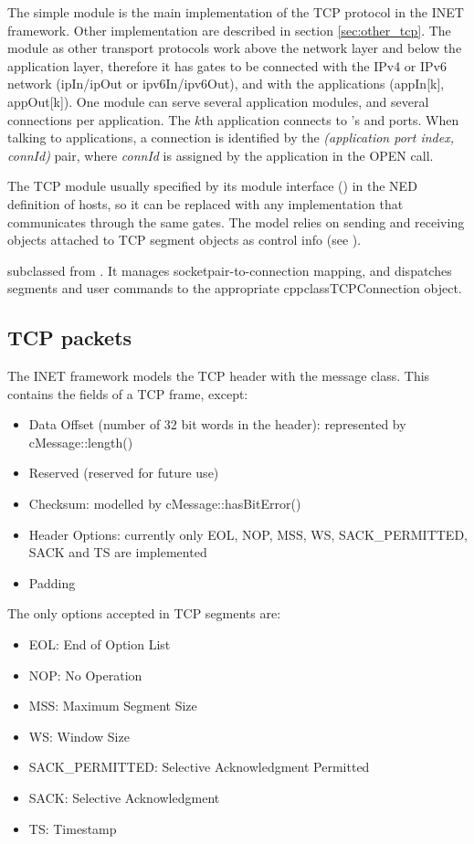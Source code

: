 The  simple module is the main implementation of the TCP protocol in the INET framework.
Other implementation are described in section \ref{sec:other_tcp}.
The  module as other transport protocols work above the network layer and below the application
layer, therefore it has gates to be connected with the IPv4 or IPv6 network (ipIn/ipOut or ipv6In/ipv6Out),
and with the applications (appIn[k], appOut[k]).
One  module can serve several application modules, and several
connections per application. The $k$th application connects to 's
 and  ports. When talking to applications, a
connection is identified by the \textit{(application port index, connId)} pair,
where \textit{connId} is assigned by the application in the OPEN call.

The TCP module usually specified by its module interface
() in the NED definition of hosts, so it can be replaced with any implementation
that communicates through the same gates. The  model relies on
sending and receiving  objects
attached to TCP segment objects as control info (see ).

 subclassed from . It manages socketpair-to-connection
mapping, and dispatches segments and user commands to the appropriate cppclass{TCPConnection} object.

\subsection{TCP packets}

The INET framework models the TCP header with the  message class.
This contains the fields of a TCP frame, except:
\begin{itemize}
  \item Data Offset (number of 32 bit words in the header): represented by cMessage::length()
  \item Reserved (reserved for future use)
  \item Checksum: modelled by cMessage::hasBitError()
  \item Header Options: currently only EOL, NOP, MSS, WS, SACK\_PERMITTED, SACK and TS are implemented
  \item Padding
\end{itemize}

The only options accepted in TCP segments are:
\begin{itemize}
  \item EOL: End of Option List
  \item NOP: No Operation
  \item MSS: Maximum Segment Size
  \item WS: Window Size
  \item SACK\_PERMITTED: Selective Acknowledgment Permitted
  \item SACK: Selective Acknowledgment
  \item TS: Timestamp
\end{itemize}

